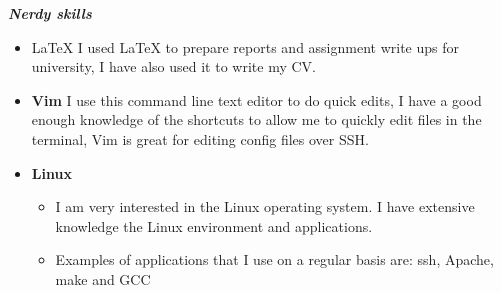 \documentclass{res}
\begin{document}
\begin{resume}
\vspace{8pt}
\vspace{8pt}
{\sl \textbf{Nerdy skills}}
\begin{itemize}
        \item \LaTeX{} I used \LaTeX{} to prepare reports and assignment write ups for university, I have also used it to write my CV.
        \item \textbf{Vim} I use this command line text editor to do quick edits, I have a good enough knowledge of the shortcuts to allow me to quickly edit files in the terminal, Vim is great for editing config files over SSH.
        \item \textbf{Linux}
        \begin{itemize}
                \item I am very interested in the Linux operating system. I have extensive knowledge the Linux environment and applications.
                \item Examples of applications that I use on a regular basis are: ssh, Apache, make and GCC
        \end{itemize}
\end{itemize}

\end{resume} 
\end{document}
